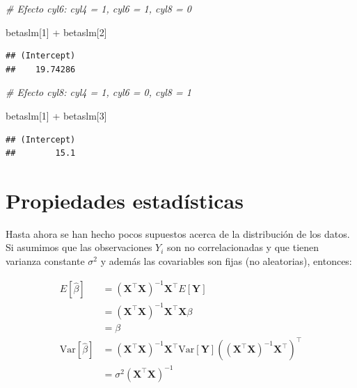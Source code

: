 \documentclass[
  12pt,
]{book}
\newenvironment{Shaded}{\begin{snugshade}}{\end{snugshade}}
\newcommand{\CommentTok}[1]{\textcolor[rgb]{0.56,0.35,0.01}{\textit{#1}}}
\newcommand{\DecValTok}[1]{\textcolor[rgb]{0.00,0.00,0.81}{#1}}
\newcommand{\NormalTok}[1]{#1}
\newcommand{\SpecialCharTok}[1]{\textcolor[rgb]{0.00,0.00,0.00}{#1}}
\begin{document}
\begin{Shaded}
\begin{Highlighting}[]
\CommentTok{\# Efecto cyl6: cyl4 = 1, cyl6 = 1, cyl8 = 0}

\NormalTok{betaslm[}\DecValTok{1}\NormalTok{] }\SpecialCharTok{+}\NormalTok{ betaslm[}\DecValTok{2}\NormalTok{]}
\end{Highlighting}
\end{Shaded}

\begin{verbatim}
## (Intercept) 
##    19.74286
\end{verbatim}

\begin{Shaded}
\begin{Highlighting}[]
\CommentTok{\# Efecto cyl8: cyl4 = 1, cyl6 = 0, cyl8 = 1}

\NormalTok{betaslm[}\DecValTok{1}\NormalTok{] }\SpecialCharTok{+}\NormalTok{ betaslm[}\DecValTok{3}\NormalTok{]}
\end{Highlighting}
\end{Shaded}

\begin{verbatim}
## (Intercept) 
##        15.1
\end{verbatim}

\hypertarget{propiedades-estaduxedsticas-3}{%
\section{Propiedades estadísticas}\label{propiedades-estaduxedsticas-3}}

Hasta ahora se han hecho pocos supuestos acerca de la distribución de
los datos. Si asumimos que las observaciones \(Y_i\) son no
correlacionadas y que tienen varianza constante \(\sigma^2\) y además
las covariables son fijas (no aleatorias), entonces:

\begin{align*}
E[\hat \beta]&=(\boldsymbol{X}^{\top} \boldsymbol{X})^{-1} \boldsymbol{X}^{\top}E[\boldsymbol{Y}] \\ 
&=(\boldsymbol{X}^{\top} \boldsymbol{X})^{-1} \boldsymbol{X}^{\top}\boldsymbol{X}\beta\\
&=\beta \\
\text{Var}[\hat \beta] &= (\boldsymbol{X}^{\top} \boldsymbol{X})^{-1} \boldsymbol{X}^{\top}\text{Var}[\boldsymbol{Y}] ((\boldsymbol{X}^{\top} \boldsymbol{X})^{-1} \boldsymbol{X}^{\top})^{\top} \\
& = \sigma^2 (\boldsymbol{X}^{\top} \boldsymbol{X})^{-1}
\end{align*}
\end{document}
